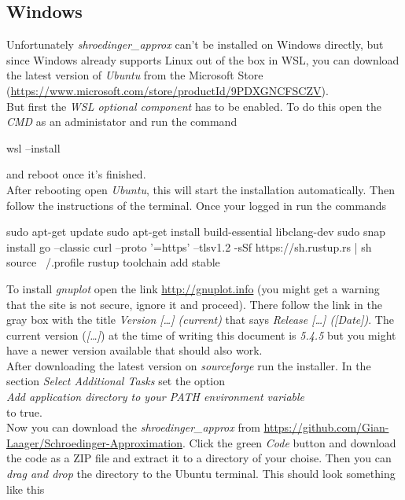 \documentclass[11pt,DIV=10,final]{scrreprt} %
\begin{document}
\subsection{Windows}
Unfortunately \emph{shroedinger\_approx} can't be installed on Windows directly, but since
Windows already supports Linux out of the box in WSL, you can download the latest version of
\emph{Ubuntu} from the Microsoft Store (\url{https://www.microsoft.com/store/productId/9PDXGNCFSCZV}).
\\[3ex]
But first the \emph{WSL optional component} has to be enabled. To do this open the \emph{CMD}
as an administator and run the command
\begin{bashcode}
wsl --install
\end{bashcode}
and reboot once it's finished.
\\[3ex]
After rebooting open \emph{Ubuntu}, this will start the installation automatically. Then
follow the instructions of the terminal. Once your logged in run the commands
\begin{bashcode}
sudo apt-get update
sudo apt-get install build-essential libclang-dev
sudo snap install go --classic
curl --proto '=https' --tlsv1.2 -sSf https://sh.rustup.rs | sh
source ~/.profile
rustup toolchain add stable
\end{bashcode}
\vspace*{3ex}
To install \emph{gnuplot} open the link
\url{http://gnuplot.info} (you might get a warning that the site is not secure, ignore it and
proceed). There follow the link in the gray box with the title
\emph{Version [\dots] (current)} that says \emph{Release [\dots] ([Date])}. The current
version (\emph{[\dots]}) at the time of writing this document is \emph{5.4.5} but you might
have a newer version available that should also work.
\\[3ex]
After downloading the latest version on \emph{sourceforge} run the installer. In the section
\emph{Select Additional Tasks} set the option \\
\hspace*{3ex}\emph{Add application directory to your PATH environment variable} \\
to true.
\\[3ex]
Now you can download the \emph{shroedinger\_approx} from \url{https://github.com/Gian-Laager/Schroedinger-Approximation}.
Click the green \emph{Code} button and download the code as a ZIP file and extract it to a directory of your choise.
Then you can \emph{drag and drop} the directory to the Ubuntu terminal. This should look something like this
\end{document}
